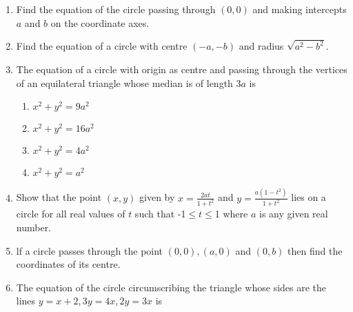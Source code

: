 \begin{enumerate}[label=\thesubsection.\arabic*,ref=\thesubsection.\theenumi]
  \item Find the equation of the circle passing through $(0,0)$ and making intercepts $a$ and $b$ on the coordinate axes.
  \item Find the equation of a circle with centre $(-a,-b)$ and radius $\sqrt{a^{2}-b^{2}}$.
	 \\
		\solution
\label{chapters/11/11/1/5}

\item The equation of a circle with origin as centre and passing through the vertices of an equilateral triangle whose median is of length $3 a$ is
\begin{enumerate}
\item $x^2+y^2=9a^2$
\item $x^2+y^2=16a^2$
\item $x^2+y^2=4a^2$
\item $x^2+y^2=a^2$
\end{enumerate}
 \item Show that the point $(x,y)$ given by $x=\frac{2at}{1+t^2}$ and $y=\frac{a(1-t^2)}{1+t^2}$ lies on a circle for all real values of $t$ such that -1$\le t \le $1 where $a$ is any given real number. 
 \item lf a circle passes through the point $(0,0), (a,0)$ and $(0,b)$ then find the coordinates of its centre.
\item The equation of the circle circumscribing the triangle whose sides are the lines $y=x+2, 3y=4x, 2y=3x$ is  \makebox[1cm]{\hrulefill}         
\end{enumerate}
